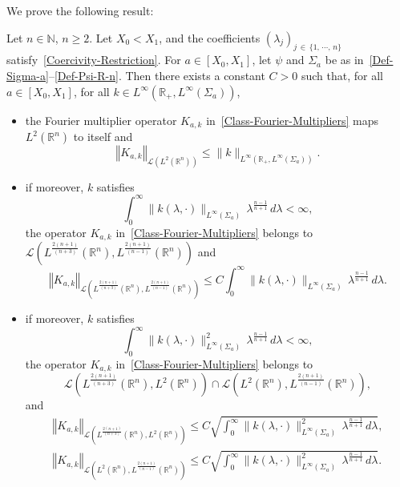 \documentclass[AHL,Unicode,longabstracts]{cedram}
\newcommand{\scL}{\mathscr{L}}
\newcommand*\R{\mathbb{R}}
\newcommand*\N{\mathbb{N}}
\newcommand{\norm}[1]{\left\Vert#1\right\Vert}
\renewcommand{\leq}{\leqslant}
\renewcommand{\geq}{\geqslant}
\begin{document}
We prove the following result:
\begin{prop}\label{Prop-Est-Fourier-Op}
Let $n\in \N$, $n\geq 2$. Let $X_0 <X_1$, and the coefficients $(\lambda_j)_{j\, \in\,\{1, \,\cdots,\,n\}}$ satisfy~\eqref{Coercivity-Restriction}. For $a \in [X_0,X_1]$, let $\psi$ and $\Sigma_a$ be as in~\eqref{Def-Sigma-a}--\eqref{Def-Psi-R-n}. Then there exists a constant $C>0$ such that, for all $a \in [X_0,X_1]$, for all $k \in L^\infty(\R_+, L^\infty(\Sigma_a))$,
\begin{itemize}
\item the Fourier multiplier operator $K_{a,k}$ in~\eqref{Class-Fourier-Multipliers} maps $L^2(\R^{n})$ to itself and
\begin{equation}\label{Est-K-a-k-L2-L2}
\norm{K_{a,k}}_{\scL\left(L^2(\R^n)\right)}
\leq
\| k \|_{L^\infty\left(\R_+, L^\infty(\Sigma_a)\right)}.
\end{equation}
\item if moreover, $k$ satisfies
\[
\int_0^\infty \| k(\lambda, \cdot)\|_{L^\infty(\Sigma_a)} \, \lambda^{\frac{n-1}{n+1}} \, d\lambda < \infty,
\]
the operator $K_{a,k}$ in~\eqref{Class-Fourier-Multipliers} belongs to $\scL(L^{\frac{2(n+1)}{(n+3)}}(\R^n),L^{\frac{2(n+1)}{(n-1)}}(\R^n))$ and
\begin{equation}\label{Est-K-a-k-Lp-Lp'}
\norm{K_{a,k}}_{\scL\left(L^{\frac{2(n+1)}{(n+3)}}\left(\R^n\right),L^{\frac{2(n+1)}{(n-1)}}\left(\R^n\right)\right)}
\leq C \int_0^\infty \| k(\lambda, \cdot)\|_{L^\infty(\Sigma_a)} \, \lambda^{\frac{n-1}{n+1}} \, d\lambda.
\end{equation}
\item if moreover, $k$ satisfies
\[
\int_0^\infty \| k(\lambda, \cdot)\|_{L^\infty(\Sigma_a)}^2 \, \lambda^{\frac{n-1}{n+1}} \, d\lambda < \infty,
\]
the operator $K_{a,k}$ in~\eqref{Class-Fourier-Multipliers} belongs to
\[
\scL\left(L^{\frac{2(n+1)}{(n+3)}}\left(\R^n\right),L^{2}\left(\R^n\right)\right) \cap \scL\left(L^{2}\left(\R^n\right), L^{\frac{2(n+1)}{(n-1)}}\left(\R^n\right)\right),
\]
and
\begin{align}
\norm{K_{a,k}}_{\scL\left(L^{\frac{2(n+1)}{(n+3)}}\left(\R^n\right),L^{2}\left(\R^n\right)\right)}
\leq C \sqrt{\int_0^\infty \| k(\lambda, \cdot)\|_{L^\infty(\Sigma_a)}^2 \, \lambda^{\frac{n-1}{n+1}} \, d\lambda},
\label{Est-K-a-k-Lp-L2}
\\
\norm{K_{a,k}}_{\scL\left(L^{2}\left(\R^n\right), L^{\frac{2(n+1)}{(n-1)}}\left(\R^n\right)\right)}
\leq C \sqrt{\int_0^\infty \| k(\lambda, \cdot)\|_{L^\infty(\Sigma_a)}^2 \, \lambda^{\frac{n-1}{n+1}} \, d\lambda}.\label{Est-K-a-k-L2-Lp'}
\end{align}
\end{itemize}
\end{prop}
\end{document}

